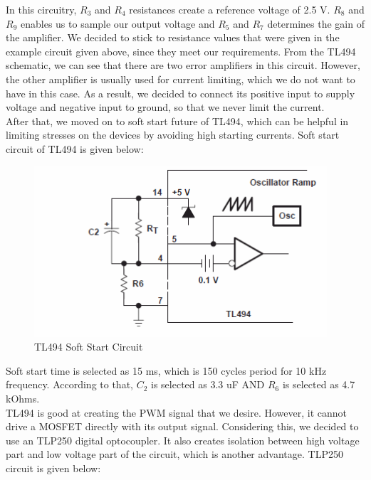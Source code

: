 \documentclass{article}
\newcommand\tab[1][1cm]{\hspace*{#1}}
\begin{document}
\tab In this circuitry, $R_3$ and $R_4$ resistances create a reference voltage of 2.5 V. $R_8$ and $R_9$ enables us to sample our output voltage and $R_5$ and $R_7$ determines the gain of the amplifier. We decided to stick to resistance values that were given in the example circuit given above, since they meet our requirements. From the TL494 schematic, we can see that there are two error amplifiers in this circuit. However, the other amplifier is usually used for current limiting, which we do not want to have in this case. As a result, we decided to connect its positive input to supply voltage and negative input to ground, so that we never limit the current. \\

\tab After that, we moved on to soft start future of TL494, which can be helpful in limiting stresses on the devices by avoiding high starting currents. Soft start circuit of TL494 is given below:

\begin{figure}[H]
    \centering
    \includegraphics[scale=0.5]{soft.PNG}
    \caption{TL494 Soft Start Circuit}
    \label{fig:my_label}
\end{figure}

\tab Soft start time is selected as 15 ms, which is 150 cycles period for 10 kHz frequency. According to that, $C_2$ is selected as 3.3 uF AND $R_6$ is selected as 4.7 kOhms. \\

\tab TL494 is good at creating the PWM signal that we desire. However, it cannot drive a MOSFET directly with its output signal. Considering this, we decided to use an TLP250 digital optocoupler. It also creates isolation between high voltage part and low voltage part of the circuit, which is another advantage. TLP250 circuit is given below:
\end{document}
